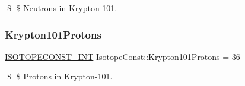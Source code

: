 \$ \$ Neutrons in Krypton-\/101. \mbox{\label{group___isotope_const-_krypton-_kr101_ga6379e743f97bce840be6e49e3198c9dc}} 
\subsubsection{\texorpdfstring{Krypton101\+Protons}{Krypton101Protons}}
{\footnotesize\ttfamily \mbox{\hyperlink{group___isotope_const-_macros_ga5f18360b3e99483a35c32d789e62621c}{I\+S\+O\+T\+O\+P\+E\+C\+O\+N\+S\+T\+\_\+\+I\+NT}} Isotope\+Const\+::\+Krypton101\+Protons = 36}

\$ \$ Protons in Krypton-\/101. 